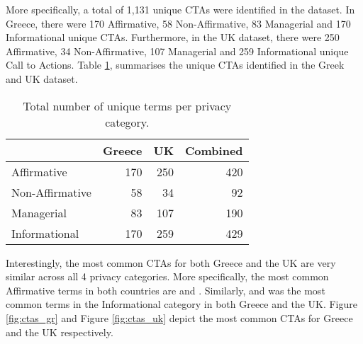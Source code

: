 \documentclass[../main.tex]{subfiles}
\begin{document}
More specifically, a total of 1,131 unique CTAs were identified in the dataset. In Greece, there were 170 Affirmative, 58 Non-Affirmative, 83 Managerial and 170 Informational unique CTAs. Furthermore, in the UK dataset, there were 250 Affirmative, 34 Non-Affirmative, 107 Managerial and 259 Informational unique Call to Actions. Table \ref{tab:unique_ctas}, summarises the unique CTAs identified in the Greek and UK dataset. 

\begin{table}[ht]
    \centering
    \begin{tabular}{@{}lrrr@{}}
        \toprule
                        & Greece & UK   & Combined  \\ \midrule
        Affirmative     & 170    & 250  & 420       \\
        Non-Affirmative & 58     & 34   & 92        \\
        Managerial      & 83     & 107  & 190       \\
        Informational   & 170    & 259  & 429       \\ \bottomrule
    \end{tabular}
    \caption{Total number of unique terms per privacy category.}
    \label{tab:unique_ctas}
\end{table}

Interestingly, the most common CTAs for both Greece and the UK are very similar across all 4 privacy categories. More specifically, the most common Affirmative terms in both countries are  and . Similarly,  and  was the most common terms in the Informational category in both Greece and the UK. Figure \ref{fig:ctas_gr} and Figure \ref{fig:ctas_uk} depict the most common CTAs for Greece and the UK respectively.

\grAffirmativeCtas

\grNonAffirmativeCtas
\end{document}

